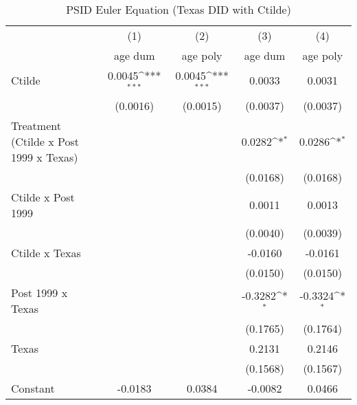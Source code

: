 {
\def\sym#1{\ifmmode^{#1}\else\(^{#1}\)\fi}
\begin{longtable}{l*{4}{c}}
\caption{PSID Euler Equation (Texas DID with Ctilde)}\\
\toprule\endfirsthead\midrule\endhead\midrule\endfoot\endlastfoot
                    &\multicolumn{1}{c}{(1)}&\multicolumn{1}{c}{(2)}&\multicolumn{1}{c}{(3)}&\multicolumn{1}{c}{(4)}\\
                    &\multicolumn{1}{c}{age dum}&\multicolumn{1}{c}{age poly}&\multicolumn{1}{c}{age dum}&\multicolumn{1}{c}{age poly}\\
\midrule
Ctilde              &      0.0045\sym{***}&      0.0045\sym{***}&      0.0033         &      0.0031         \\
                    &    (0.0016)         &    (0.0015)         &    (0.0037)         &    (0.0037)         \\
\addlinespace
Treatment (Ctilde x Post 1999 x Texas)&                     &                     &      0.0282\sym{*}  &      0.0286\sym{*}  \\
                    &                     &                     &    (0.0168)         &    (0.0168)         \\
\addlinespace
Ctilde x Post 1999  &                     &                     &      0.0011         &      0.0013         \\
                    &                     &                     &    (0.0040)         &    (0.0039)         \\
\addlinespace
Ctilde x Texas      &                     &                     &     -0.0160         &     -0.0161         \\
                    &                     &                     &    (0.0150)         &    (0.0150)         \\
\addlinespace
Post 1999 x Texas   &                     &                     &     -0.3282\sym{*}  &     -0.3324\sym{*}  \\
                    &                     &                     &    (0.1765)         &    (0.1764)         \\
\addlinespace
Texas               &                     &                     &      0.2131         &      0.2146         \\
                    &                     &                     &    (0.1568)         &    (0.1567)         \\
\addlinespace
Constant            &     -0.0183         &      0.0384         &     -0.0082         &      0.0466         \\

\end{longtable}}
